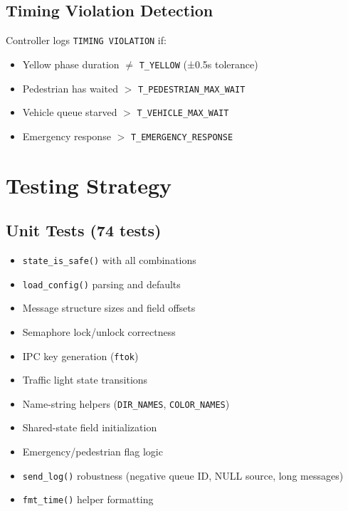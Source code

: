 \documentclass[11pt,a4paper]{article}
\begin{document}
\subsection{Timing Violation Detection}

Controller logs \texttt{TIMING VIOLATION} if:
\begin{itemize}[noitemsep]
    \item Yellow phase duration $\neq$ \texttt{T\_YELLOW} (±0.5s tolerance)
    \item Pedestrian has waited $>$ \texttt{T\_PEDESTRIAN\_MAX\_WAIT}
    \item Vehicle queue starved $>$ \texttt{T\_VEHICLE\_MAX\_WAIT}
    \item Emergency response $>$ \texttt{T\_EMERGENCY\_RESPONSE}
\end{itemize}

\newpage
\section{Testing Strategy}

\subsection{Unit Tests (74 tests)}
\begin{itemize}[noitemsep]
    \item \texttt{state\_is\_safe()} with all combinations
    \item \texttt{load\_config()} parsing and defaults
    \item Message structure sizes and field offsets
    \item Semaphore lock/unlock correctness
    \item IPC key generation (\texttt{ftok})
    \item Traffic light state transitions
    \item Name-string helpers (\texttt{DIR\_NAMES}, \texttt{COLOR\_NAMES})
    \item Shared-state field initialization
    \item Emergency/pedestrian flag logic
    \item \texttt{send\_log()} robustness (negative queue ID, NULL source, long messages)
    \item \texttt{fmt\_time()} helper formatting
\end{itemize}
\end{document}
